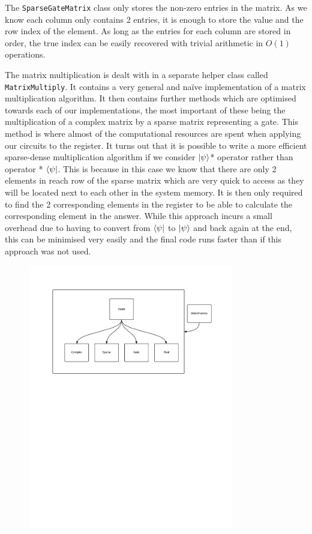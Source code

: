 \documentclass[bibliography=totocnumbered, 10pt]{article}
\theoremstyle{NoticeStyle}
\begin{document}
The \texttt{SparseGateMatrix} class only stores the non-zero entries in the matrix. As we know each column only contains 2 entries, it is enough to store the value and the row index of the element. As long as the entries for each column are stored in order, the true index can be easily recovered with trivial arithmetic in $O(1)$ operations.

The matrix multiplication is dealt with in a separate helper class called \texttt{MatrixMultiply}. It contains a very general and naïve implementation of a matrix multiplication algorithm. It then contains further methods which are optimised towards each of our implementations, the most important of these being the multiplication of a complex matrix by a sparse matrix representing a gate. This method is where almost of the computational resources are spent when applying our circuits to the register. It turns out that it is possible to write a more efficient sparse-dense multiplication algorithm if we consider ${\left\vert{\psi}\right\rangle}$* operator rather than operator * ${\left\langle{\psi}\right\vert}$. This is because in this case we know that there are only 2 elements in reach row of the sparse matrix which are very quick to access as they will be located next to each other in the system memory. It is then only required to find the 2 corresponding elements in the register to be able to calculate the corresponding element in the answer. While this approach incurs a small overhead due to having to convert from ${\left\langle{\psi}\right\vert}$ to ${\left\vert{\psi}\right\rangle}$ and back again at the end, this can be minimised very easily and the final code runs faster than if this approach was not used.

\begin{figure}[H]
\centering
\includegraphics[width=0.8\textwidth]{img/MatrixDesign.pdf}
\caption{}
\end{figure}
\end{document}
